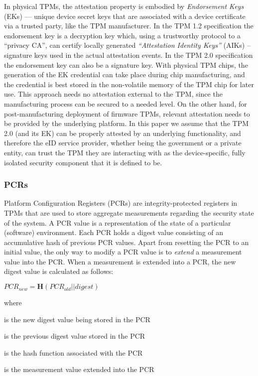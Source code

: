 \documentclass{sig-alternate-2013}
\begin{document}
In physical TPMs, the attestation property is embodied by \emph{Endorsement
Keys} (EKs) — unique device secret keys that are associated with a device
certificate via a trusted party, like the TPM manufacturer. In the TPM 1.2
specification the endorsement key is a decryption key which, using a trustworthy
protocol to a “privacy CA”, can certify locally generated \emph{“Attestation
Identity Keys”} (AIKs) – signature keys used in the actual attestation events.
In the TPM 2.0 specification the endorsement key can also be a signature key.
With physical TPM chips, the generation of the EK credential can take place
during chip manufacturing, and the credential is best stored in the non-volatile
memory of the TPM chip for later use. This approach needs no attestation
external to the TPM, since the manufacturing process can be secured to a needed
level. On the other hand, for post-manufacturing deployment of firmware TPMs,
relevant attestation needs to be provided by the underlying platform. In this
paper we assume that the TPM 2.0 (and its EK) can be properly attested by an
underlying functionality, and therefore the eID service provider, whether being
the government or a private entity, can trust the TPM they are interacting with
as the device-specific, fully isolated security component that it is defined to
be.

\subsubsection{PCRs}

Platform Configuration Registers (PCRs) are integrity-protected registers in
TPMs that are used to store aggregate measurements regarding the security state
of the system. A PCR value is a representation of the state of a particular
(software) environment. Each PCR holds a digest value consisting of an
accumulative hash of previous PCR values.  Apart from resetting the PCR to an
initial value, the only way to modify a PCR value is to \emph{extend} a
measurement value into the PCR\@. When a measurement is extended into a PCR, the
new digest value is calculated as follows:

\vspace{.5\baselineskip}
\noindent
$PCR_{new} = \mathbf{H}(PCR_{old} || digest)$

\vspace{.5\baselineskip}
\noindent where

\vspace{.5\baselineskip}
\begin{description}
\vspace{-.25cm}
  \scriptsize
  \item[$PCR_{new}$] \hfill is the new digest value being stored in the PCR
  \item[$PCR_{old}$] \hfill is the previous digest value stored in the PCR
  \item[$\mathbf{H}()$] \hfill is the hash function associated with the PCR
  \item[$digest$] \hfill is the measurement value extended into the PCR
\end{description}
\end{document}
